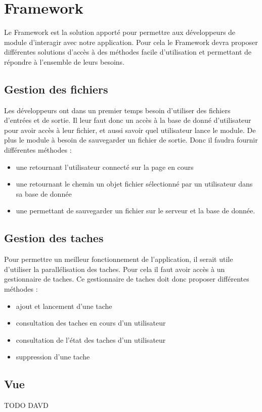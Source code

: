 \section{Framework}

Le Framework est la solution apporté pour permettre aux développeurs de module d'interagir avec notre application. Pour cela le Framework devra proposer différentes solutions d'accès à des méthodes facile d'utilisation et permettant de répondre à l'ensemble de leurs besoins. \\


\subsection{Gestion des fichiers}

Les développeurs ont dans un premier temps besoin d'utiliser des fichiers d'entrées et de sortie. Il leur faut donc un accès à la base de donné d'utilisateur pour avoir accès à leur fichier, et aussi savoir quel utilisateur lance le module. De plus le module à besoin de sauvegarder un fichier de sortie. Donc il faudra fournir différentes méthodes :\\
\begin{itemize}
\item une retournant l'utilisateur connecté sur la page en cours
\item une retournant le chemin un objet fichier sélectionné par un utilisateur dans sa base de donnée
\item une permettant de sauvegarder un fichier sur le serveur et la base de donnée.
\end{itemize}

\subsection{Gestion des taches}

Pour permettre un meilleur fonctionnement de l'application, il serait utile d'utiliser la parallélisation des taches. Pour cela il faut avoir accès à un gestionnaire de taches. Ce gestionnaire de taches doit donc proposer différentes méthodes : \\
\begin{itemize}
\item ajout et lancement d'une tache
\item consultation des taches en cours d'un utilisateur
\item consultation de l'état des taches d'un utilisateur
\item suppression d'une tache
\end{itemize}


\subsection{Vue}
TODO DAVD